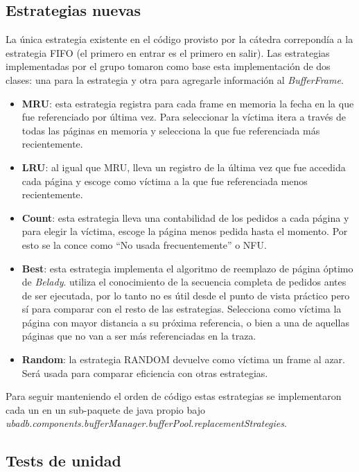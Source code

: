 \subsection{Estrategias nuevas}
La \'unica estrategia existente en el c\'odigo provisto por la c\'atedra correpond\'ia a la estrategia FIFO 
(el primero en entrar es el primero en salir). Las estrategias implementadas por el grupo tomaron como base esta
implementaci\'on de dos clases: una para la estrategia y otra para agregarle informaci\'on al \textit{BufferFrame}.
\begin{itemize}
\item \textbf{MRU}: esta estrategia registra para cada frame en memoria la fecha en la que fue referenciado por \'ultima vez. Para seleccionar la v\'ictima itera a trav\'es de todas las p\'aginas en memoria y selecciona la que fue referenciada m\'as recientemente.
\item \textbf{LRU}: al igual que MRU, lleva un registro de la \'ultima vez que fue accedida cada p\'agina y escoge como v\'ictima a la que fue referenciada menos recientemente.
\item \textbf{Count}: esta estrategia lleva una contabilidad de los pedidos a cada p\'agina y para elegir la v\'ictima, escoge 
la p\'agina menos pedida hasta el momento. Por esto se la conce como ``No usada frecuentemente'' o NFU.
\item \textbf{Best}: esta estrategia implementa el algoritmo de reemplazo de p\'agina \'optimo de \textit{Belady}. utiliza el conocimiento de la secuencia completa de pedidos antes de ser ejecutada, por lo tanto no es \'util desde el punto de vista pr\'actico
pero s\'i para comparar con el resto de las estrategias. Selecciona como v\'ictima la p\'agina con mayor distancia a su pr\'oxima referencia, o bien a una de aquellas p\'aginas que no van a ser m\'as referenciadas en la traza.
\item \textbf{Random}: la estrategia RANDOM devuelve como v\'ictima un frame al azar. Ser\'a usada para 
comparar eficiencia con otras estrategias.
\end{itemize}
Para seguir manteniendo el orden de c\'odigo estas estrategias se implementaron cada un en un sub-paquete de java propio 
bajo \textit{ubadb.components.bufferManager.bufferPool.replacementStrategies}.

\subsection{Tests de unidad}

